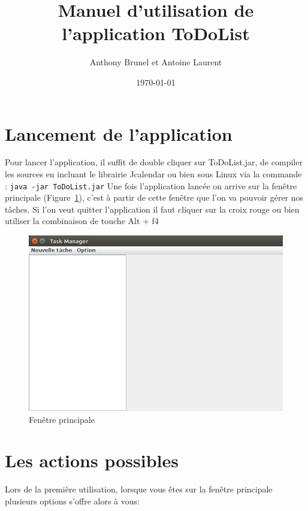 \documentclass{article}
\title{Manuel d'utilisation de l'application ToDoList}
\author{Anthony Brunel et Antoine Laurent}
\date{\today}
\begin{document}
\maketitle
\newpage
\tableofcontents
\listoffigures
\newpage

\section{Lancement de l'application}
Pour lancer l'application, il suffit de double cliquer sur ToDoList.jar, de compiler les sources en incluant le librairie Jcalendar ou bien sous Linux via la commande : \verb+java -jar ToDoList.jar+
\newline
\newline
Une fois l'application lancée on arrive sur la fenêtre principale (Figure~\ref{Fenêtre principale}), c'est à partir de cette fenêtre que l'on va pouvoir gérer nos tâches. 
\newline
Si l'on veut quitter l'application il faut cliquer sur la croix rouge ou bien utiliser la combinaison de touche Alt + f4

\begin{figure}[h]
	\centering
	\includegraphics[scale=0.34]{images/MainDIsplay.png}
	\caption{Fenêtre principale}
	\label{Fenêtre principale}
\end{figure}

\section{Les actions possibles}
Lors de la première utilisation, lorsque vous êtes sur la fenêtre principale plusieurs options s'offre alors à vous:
\newline
\end{document}
